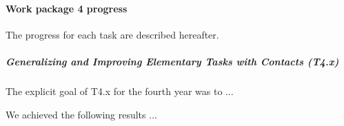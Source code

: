 

\paragraph{Work package 4 progress}

The progress for each task are described hereafter.

\subparagraph{Generalizing and Improving Elementary Tasks with Contacts (T4.x)}

The explicit goal of T4.x for the fourth year was to $\dots$

We achieved the following results $\dots$
